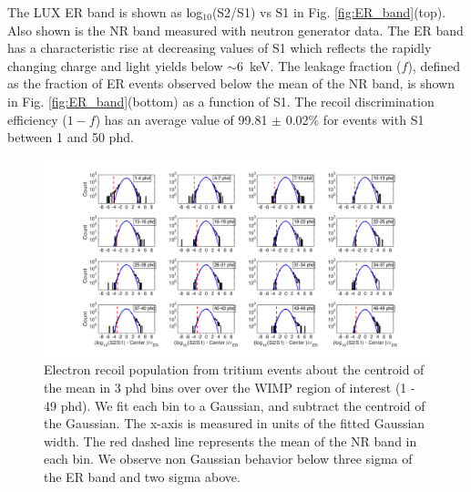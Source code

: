 The LUX ER band is shown as log$_{10}$(S2/S1) vs S1 in Fig. \ref{fig:ER_band}(top).  Also shown is the NR band measured with neutron generator data\cite{DD-paper, lux-reanalysis}. The ER band has a characteristic rise at decreasing values of S1 which reflects the rapidly changing charge and light yields below $\sim$6~keV. The leakage fraction ($f$), defined as the fraction of ER events observed below the mean of the NR band, is shown in Fig. \ref{fig:ER_band}(bottom) as a function of S1. The recoil discrimination efficiency ($1-f$) has an average value of 99.81 $\pm$ 0.02\% for events with S1 between 1 and 50 phd.


\onecolumngrid
\break
\begin{figure}
\includegraphics[width=220mm]{fig/Gaussianity/GaussER_all.png}
\caption{Electron recoil population from tritium events about the centroid of the mean in 3 phd bins over over the WIMP region of interest (1 - 49 phd). We fit each bin to a Gaussian, and subtract the centroid of the Gaussian. The x-axis is measured in units of the fitted Gaussian width. The red dashed line represents the mean of the NR band in each bin. We observe non Gaussian behavior below three sigma of the ER band and two sigma above.  }
\label{fig:ER-Gauss}
\end{figure}
\twocolumngrid


